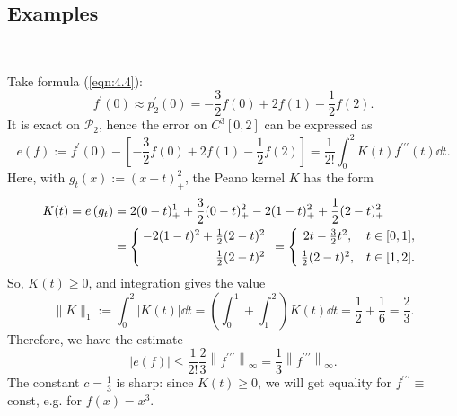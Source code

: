 \documentclass[a4paper]{article}
\begin{document}
\subsection{Examples}
\ \vspace*{-1.5em}
\begin{example}
    Take formula (\ref{eqn:4.4}):
\[
f^{\prime}(0) \approx p_2^{\prime}(0)=-\frac{3}{2} f(0)+2 f(1)-\frac{1}{2} f(2) .
\]
It is exact on $\mathcal{P}_2$, hence the error on $C^3[0,2]$ can be expressed as
\[
e(f):=f^{\prime}(0)-\left[-\frac{3}{2} f(0)+2 f(1)-\frac{1}{2} f(2)\right]=\frac{1}{2 !} \int_0^2 K(t) f^{\prime \prime \prime}(t) \dd{t} .
\]
Here, with $g_t(x):=(x-t)_{+}^2$, the Peano kernel $K$ has the form
\[
\begin{aligned}
K(t)=e\left(g_t\right) & =2(0-t)_{+}^1+\frac{3}{2}(0-t)_{+}^2-2(1-t)_{+}^2+\frac{1}{2}(2-t)_{+}^2 \\
& =\left\{\hspace*{-.3em}\begin{array}{rl}
-2(1-t)^2+\frac{1}{2}(2-t)^2 \\[.5em]
\frac{1}{2}(2-t)^2
\end{array}=\left\{\hspace*{-.3em}\begin{array}{cc}
2 t-\frac{3}{2} t^2, & t \in[0,1], \\[.5em]
\frac{1}{2}(2-t)^2, & t \in[1,2] .
\end{array}\right.\right.
\end{aligned}
\]
So, $K(t) \geq 0$, and integration gives the value
\[
\|K\|_1:=\int_0^2|K(t)| \dd{t}=\left(\int_0^1+\int_1^2\right) K(t) \dd{t}=\frac{1}{2}+\frac{1}{6}=\frac{2}{3} .
\]
Therefore, we have the estimate
\[
|e(f)| \leq \frac{1}{2 !} \frac{2}{3}\left\|f^{\prime \prime \prime}\right\|_{\infty}=\frac{1}{3}\left\|f^{\prime \prime \prime}\right\|_{\infty} .
\]
The constant $c=\frac{1}{3}$ is sharp: since $K(t) \geq 0$, we will get equality for $f^{\prime \prime \prime} \equiv$ const, e.g. for $f(x)=x^3$.
\end{example}
\end{document}
